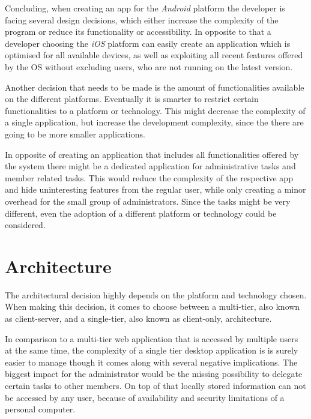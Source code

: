 Concluding, when creating an app for the \emph{Android} platform the developer is facing several design decisions, which either increase the complexity of the program or reduce its functionality or accessibility. In opposite to that a developer choosing the \emph{iOS} platform can easily create an application which is optimised for all available devices, as well as exploiting all recent features offered by the \gls{OS} without excluding users, who are not running on the latest version. 

Another decision that needs to be made is the amount of functionalities available on the different platforms. Eventually it is smarter to restrict certain functionalities to a platform or technology. This might decrease the complexity of a single application, but increase the development complexity, since the there are going to be more smaller applications.

In opposite of creating an application that includes all functionalities offered by the system there might be a dedicated application for administrative tasks and member related tasks. This would reduce the complexity of the respective app and hide uninteresting features from the regular user, while only creating a minor overhead for the small group of administrators. Since the tasks might be very different, even the adoption of a different platform or technology could be considered. 

\section{Architecture} %
\label{sec:Architecture}
The architectural decision highly depends on the platform and technology chosen. When making this decision, it comes to choose between a multi-tier, also known as client-server, and a single-tier, also known as client-only, architecture.

In comparison to a multi-tier web application that is accessed by multiple users at the same time, the complexity of a single tier desktop application is is surely easier to manage though it comes along with several negative implications. The biggest impact for the administrator would be the missing possibility to delegate certain tasks to other members. On top of that locally stored information can not be accessed by any user, because of availability and security limitations of a personal computer.


